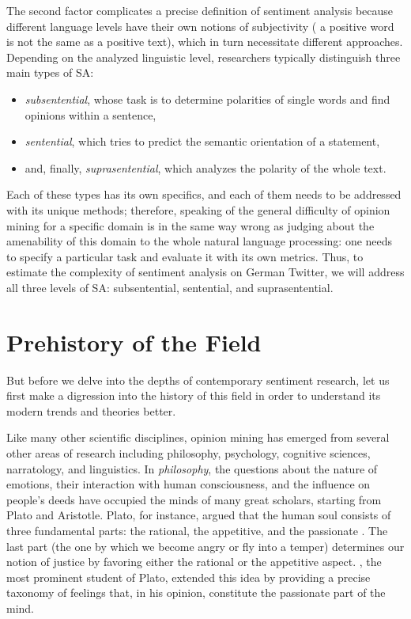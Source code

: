 The second factor complicates a precise definition of sentiment
analysis because different language levels have their own notions of
subjectivity (\eg{} a positive word is not the same as a positive
text), which in turn necessitate different approaches.  Depending on
the analyzed linguistic level, researchers typically distinguish three
main types of SA:
\begin{itemize}
  \item\emph{subsentential}, whose task is to determine polarities of
    single words and find opinions within a sentence,
  \item\emph{sentential}, which tries to predict the semantic
    orientation of a statement,
  \item and, finally, \emph{suprasentential}, which analyzes the
    polarity of the whole text.
\end{itemize}
Each of these types has its own specifics, and each of them needs to
be addressed with its unique methods; therefore, speaking of the
general difficulty of opinion mining for a specific domain is in the
same way wrong as judging about the amenability of this domain to the
whole natural language processing: one needs to specify a particular
task and evaluate it with its own metrics.  Thus, to estimate the
complexity of sentiment analysis on German Twitter, we will address
all three levels of SA: subsentential, sentential, and
suprasentential.

\section{Prehistory of the Field}

But before we delve into the depths of contemporary sentiment
research, let us first make a digression into the history of this
field in order to understand its modern trends and theories better.

Like many other scientific disciplines, opinion mining has emerged
from several other areas of research including philosophy, psychology,
cognitive sciences, narratology, and linguistics.  In
\emph{philosophy}, the questions about the nature of emotions, their
interaction with human consciousness, and the influence on people's
deeds have occupied the minds of many great scholars, starting from
Plato and Aristotle.  Plato, for instance, argued that the human soul
consists of three fundamental parts: the rational, the appetitive, and
the passionate \citep[see][Book~IV]{Plato:91}.  The last part (the one
by which we become angry or fly into a temper) determines our notion
of justice by favoring either the rational or the appetitive aspect.
\citet{Aristotle:54}, the most prominent student of Plato, extended
this idea by providing a precise taxonomy of feelings that, in his
opinion, constitute the passionate part of the mind.

